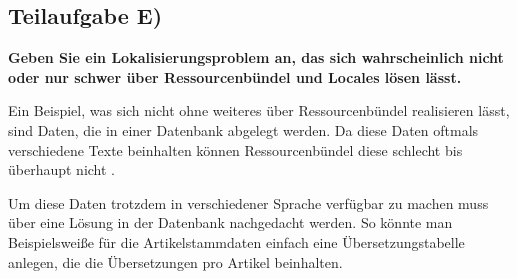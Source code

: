 \subsection{Teilaufgabe E)}
\textbf{Geben Sie ein Lokalisierungsproblem an, das sich wahrscheinlich nicht oder nur schwer
über Ressourcenbündel und Locales lösen lässt.}

Ein Beispiel, was sich nicht ohne weiteres über Ressourcenbündel realisieren
lässt, sind Daten, die in einer Datenbank abgelegt werden. Da diese Daten
oftmals verschiedene Texte beinhalten können Ressourcenbündel diese schlecht bis
überhaupt nicht . 

Um diese Daten trotzdem in verschiedener Sprache verfügbar zu machen muss über
eine Lösung in der Datenbank nachgedacht werden. So könnte man Beispielsweiße
für die Artikelstammdaten einfach eine Übersetzungstabelle anlegen, die die
Übersetzungen pro Artikel beinhalten.

\clearpage